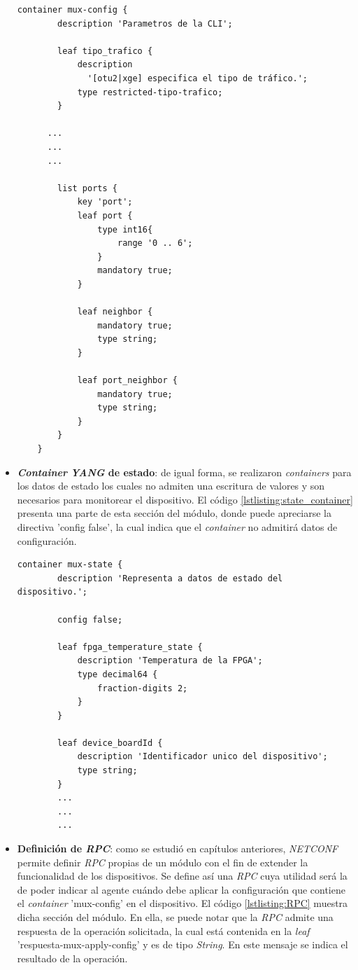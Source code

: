 \begin{itemize}
    \begin{lstlisting}[language=SHELXL, caption=\textit{Container} de configuración., label=lstlisting:config_container]
    container mux-config {
        description 'Parametros de la CLI';

        leaf tipo_trafico {
            description
              '[otu2|xge] especifica el tipo de tráfico.';
            type restricted-tipo-trafico;
        }
      
      ...
      ...
      ...
        
        list ports {
            key 'port';
            leaf port {
                type int16{
                    range '0 .. 6';
                }
                mandatory true;
            }

            leaf neighbor {
                mandatory true;
                type string;
            }
            
            leaf port_neighbor {
                mandatory true;
                type string;
            }
        }
    }
    \end{lstlisting}

    \item \textbf{\textit{Container} \textit{YANG} de estado}: de igual forma, se realizaron \textit{containers} para los datos de estado los cuales no admiten una escritura de valores y son necesarios para monitorear el dispositivo. El código \ref{lstlisting:state_container} presenta una parte de esta sección del módulo, donde puede apreciarse la directiva ’config false’, la cual indica que el \textit{container} no admitirá datos de configuración.  

    \begin{lstlisting}[language=SHELXL, caption=\textit{Container} de estado., label=lstlisting:state_container]
    container mux-state {
        description 'Representa a datos de estado del dispositivo.';
        
        config false;

        leaf fpga_temperature_state {
            description 'Temperatura de la FPGA';
            type decimal64 {
                fraction-digits 2;
            }
        }
   
        leaf device_boardId {
            description 'Identificador unico del dispositivo';
            type string;
        }
        ...
        ...
        ...
    \end{lstlisting}


    \item \textbf{Definición de \textit{RPC}}: como se estudió en capítulos anteriores, \textit{NETCONF} permite definir \textit{RPC} propias de un módulo con el fin de extender la funcionalidad de los dispositivos. Se define así una \textit{RPC} cuya utilidad será la de poder indicar al agente cuándo debe aplicar la configuración que contiene el \textit{container} 'mux-config' en el dispositivo. El código \ref{lstlisting:RPC} muestra dicha sección del módulo. En ella, se puede notar que la \textit{RPC} admite una respuesta de la operación solicitada, la cual está contenida en la \textit{leaf} 'respuesta-mux-apply-config' y es de tipo \textit{String}. En este mensaje se indica el resultado de la operación.


\end{itemize}
